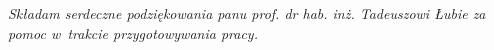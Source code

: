 \newpage
\thispagestyle{empty}
\begin{flushright}
\textit{Składam serdeczne podziękowania
panu prof. dr hab. inż. Tadeuszowi Łubie
za pomoc w~trakcie przygotowywania pracy.}
\end{flushright}
